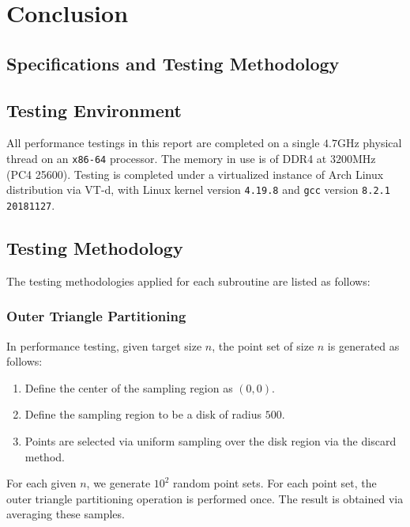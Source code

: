 \documentclass{article}
\begin{document}
\section{Conclusion}




\begin{appendices}
    \section{Specifications and Testing Methodology} \label{apdx:specifications}

    \subsection{Testing Environment}

    All performance testings in this report are completed on a single $4.7$GHz physical thread on an \texttt{x86-64} processor. The memory in use is of DDR4 at $3200$MHz (PC4 25600). Testing is completed under a virtualized instance of Arch Linux distribution via VT-d, with Linux kernel version \texttt{4.19.8} and \texttt{gcc} version \texttt{8.2.1 20181127}.

    \subsection{Testing Methodology}

    The testing methodologies applied for each subroutine are listed as follows:

    \subsubsection{Outer Triangle Partitioning}

    In performance testing, given target size $n$, the point set of size $n$ is generated as follows:
    \begin{enumerate}
        \item Define the center of the sampling region as $(0, 0)$.
        \item Define the sampling region to be a disk of radius $500$.
        \item Points are selected via uniform sampling over the disk region via the discard method.
    \end{enumerate}
    For each given $n$, we generate $10^2$ random point sets. For each point set, the outer triangle partitioning operation is performed once. The result is obtained via averaging these samples.


\end{appendices}
\end{document}

